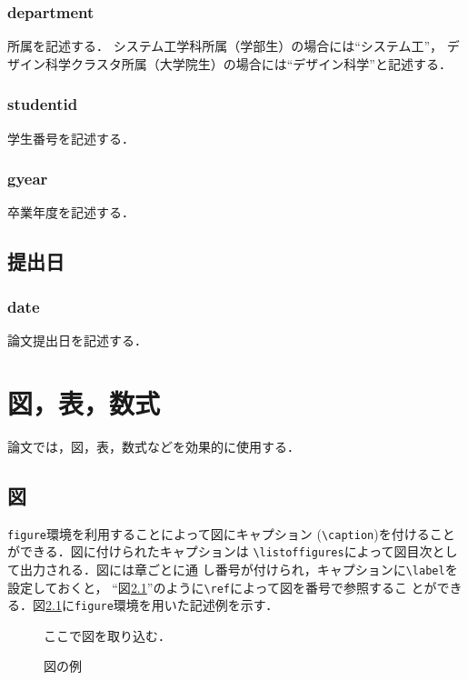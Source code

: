 \documentclass[11pt]{jreport}
\begin{document}
\subsection{department}
所属を記述する．
システム工学科所属（学部生）の場合には``システム工''，
デザイン科学クラスタ所属（大学院生）の場合には``デザイン科学''と記述する．

\subsection{studentid}
学生番号を記述する．

\subsection{gyear}
卒業年度を記述する．

\section{提出日}
\subsection{date}
論文提出日を記述する．


\chapter{図，表，数式}\label{chap:fig-tab-exp}

論文では，図，表，数式などを効果的に使用する．

\section{図}

{\tt figure}環境を利用することによって図にキャプション
(\verb|\caption|)を付けることができる．図に付けられたキャプションは
\verb|\listoffigures|によって図目次として出力される．図には章ごとに通
し番号が付けられ，キャプションに\verb|\label|を設定しておくと，
``図\ref{fig:sample}''のように\verb|\ref|によって図を番号で参照するこ
とができる．図\ref{fig:sample}に{\tt figure}環境を用いた記述例を示す．

\begin{figure}
  \centering
    ここで図を取り込む．
  \caption{図の例}
  \label{fig:sample}
\end{figure}
\end{document}
